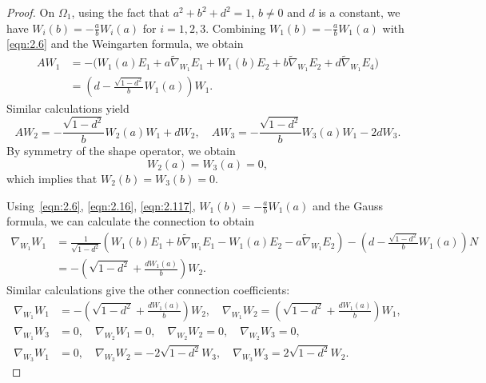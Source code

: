 \documentclass[reqno]{amsart}%
\theoremstyle{definition}
\numberwithin{equation}{section}
\begin{document}
	\begin{proof}
		On $\Omega_1$, using the fact that $a^2+b^2+d^2=1$, $b\neq0$ and $d$ is a constant,
		we have $W_i(b)=-\tfrac{a}{b}W_i(a)$ for $i=1,2,3$.
		Combining $W_1(b)=-\tfrac{a}{b}W_1(a)$ with \eqref{eqn:2.6} and the Weingarten formula,
		we obtain
		\begin{equation}\label{eqn:2.117}
			\begin{aligned}
				AW_1
				&=-\big(W_1(a)E_1+a\tilde{\nabla}_{W_1}E_1+W_1(b)E_2+b\tilde{\nabla}_{W_1}E_2
				+d\tilde{\nabla}_{W_1}E_4\big)\\
				&=\left(d-\frac{\sqrt{1-d^2}}{b} W_1(a) \right)W_1.
			\end{aligned}
		\end{equation}
		Similar calculations yield
		\begin{equation}\label{eqn:2.17}
			AW_2 = -\frac{\sqrt{1-d^2}}{b}W_2(a) W_1+dW_2,\quad
			AW_3 = -\frac{\sqrt{1-d^2}}{b}W_3(a) W_1-2dW_3.
		\end{equation}
		By symmetry of the shape operator, we obtain
		\begin{equation}\label{eqn:8.46}
			W_2(a)=W_3(a)=0,
		\end{equation}
		which implies that $W_2(b)=W_3(b)=0$.
		
		Using~\eqref{eqn:2.6}, \eqref{eqn:2.16}, \eqref{eqn:2.117},
		$W_1(b)=-\tfrac{a}{b}W_1(a)$ and the Gauss formula,
		we can calculate the connection to obtain
		\begin{equation*}
			\begin{aligned}
				\nabla_{W_1}W_1
				&=\frac{1}{\sqrt{1-d^2}}
				\left(W_1(b)E_1+b\tilde{\nabla}_{W_1}E_1-W_1(a)E_2
				-a\tilde{\nabla}_{W_1}E_2\right)
				-\left(d-\frac{\sqrt{1-d^2}}{b}W_1(a)\right)N\\
				&=-\left(\sqrt{1-d^2}+\frac{dW_1(a)}{b}\right)W_2.
			\end{aligned}
		\end{equation*}
		Similar calculations give the other connection coefficients:
		\begin{equation}\label{eqn:2.19}
			\begin{aligned}
				\nabla_{W_1}W_1&=-\left(\sqrt{1-d^2}+\frac{dW_1(a)}{b}\right)W_2, \quad
				\nabla_{W_1}W_2=\left(\sqrt{1-d^2}+\frac{dW_1(a)}{b}\right)W_1,\\
				\nabla_{W_1}W_3&=0, \quad \nabla_{W_2}W_1=0, \quad \nabla_{W_2}W_2=0, \quad \nabla_{W_2}W_3=0,\\
				\nabla_{W_3}W_1&=0, \quad \nabla_{W_3}W_2=-2\sqrt{1-d^2}W_3, \quad \nabla_{W_3}W_3=2\sqrt{1-d^2}W_2.
			\end{aligned}
		\end{equation}
		

\end{proof}
\end{document}
